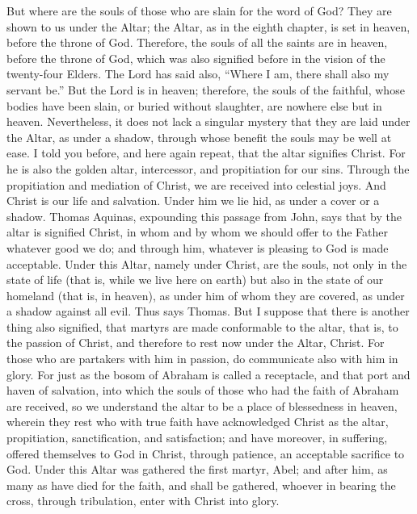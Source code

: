 But where are the souls of those who are slain for the word of God? They are shown to us under the Altar; the Altar, as in the eighth chapter, is set in heaven, before the throne of God. Therefore, the souls of all the saints are in heaven, before the throne of God, which was also signified before in the vision of the twenty-four Elders. The Lord has said also, “Where I am, there shall also my servant be.” But the Lord is in heaven; therefore, the souls of the faithful, whose bodies have been slain, or buried without slaughter, are nowhere else but in heaven. Nevertheless, it does not lack a singular mystery that they are laid under the Altar, as under a shadow, through whose benefit the souls may be well at ease. I told you before, and here again repeat, that the altar signifies Christ. For he is also the golden altar, intercessor, and propitiation for our sins. Through the propitiation and mediation of Christ, we are received into celestial joys. And Christ is our life and salvation. Under him we lie hid, as under a cover or a shadow. Thomas Aquinas, expounding this passage from John, says that by the altar is signified Christ, in whom and by whom we should offer to the Father whatever good we do; and through him, whatever is pleasing to God is made acceptable. Under this Altar, namely under Christ, are the souls, not only in the state of life (that is, while we live here on earth) but also in the state of our homeland (that is, in heaven), as under him of whom they are covered, as under a shadow against all evil. Thus says Thomas. But I suppose that there is another thing also signified, that martyrs are made conformable to the altar, that is, to the passion of Christ, and therefore to rest now under the Altar, Christ. For those who are partakers with him in passion, do communicate also with him in glory. For just as the bosom of Abraham is called a receptacle, and that port and haven of salvation, into which the souls of those who had the faith of Abraham are received, so we understand the altar to be a place of blessedness in heaven, wherein they rest who with true faith have acknowledged Christ as the altar, propitiation, sanctification, and satisfaction; and have moreover, in suffering, offered themselves to God in Christ, through patience, an acceptable sacrifice to God. Under this Altar was gathered the first martyr, Abel; and after him, as many as have died for the faith, and shall be gathered, whoever in bearing the cross, through tribulation, enter with Christ into glory.

